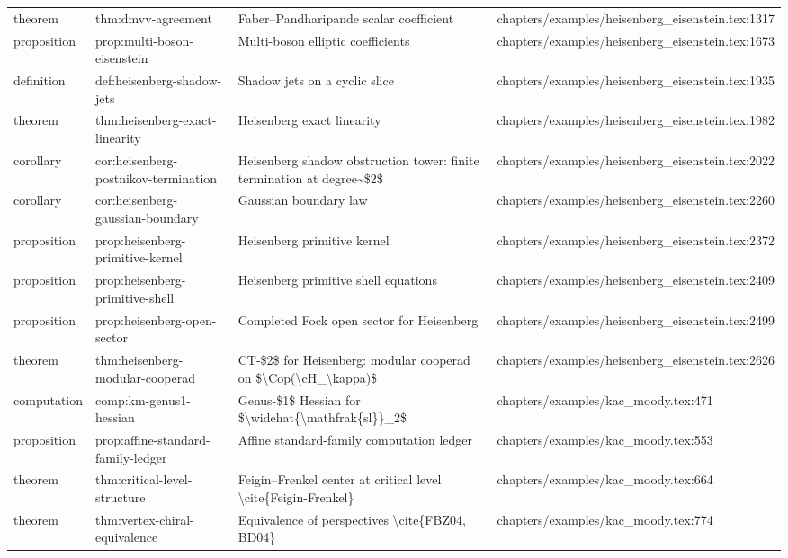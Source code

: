 \documentclass[11pt]{article}
\begin{document}
\begin{longtable}{L{0.10\textwidth}L{0.26\textwidth}L{0.42\textwidth}L{0.22\textwidth}}
theorem & thm:dmvv-agreement & Faber--Pandharipande scalar coefficient & chapters/examples/heisenberg\_eisenstein.tex:1317\\
proposition & prop:multi-boson-eisenstein & Multi-boson elliptic coefficients & chapters/examples/heisenberg\_eisenstein.tex:1673\\
definition & def:heisenberg-shadow-jets & Shadow jets on a cyclic slice & chapters/examples/heisenberg\_eisenstein.tex:1935\\
theorem & thm:heisenberg-exact-linearity & Heisenberg exact linearity & chapters/examples/heisenberg\_eisenstein.tex:1982\\
corollary & cor:heisenberg-postnikov-termination & Heisenberg shadow obstruction tower: finite termination at degree\textasciitilde{}\$2\$ & chapters/examples/heisenberg\_eisenstein.tex:2022\\
corollary & cor:heisenberg-gaussian-boundary & Gaussian boundary law & chapters/examples/heisenberg\_eisenstein.tex:2260\\
proposition & prop:heisenberg-primitive-kernel & Heisenberg primitive kernel & chapters/examples/heisenberg\_eisenstein.tex:2372\\
proposition & prop:heisenberg-primitive-shell & Heisenberg primitive shell equations & chapters/examples/heisenberg\_eisenstein.tex:2409\\
proposition & prop:heisenberg-op{}en-sector & Completed Fock op{}en sector for Heisenberg & chapters/examples/heisenberg\_eisenstein.tex:2499\\
theorem & thm:heisenberg-modular-cooperad & CT-\$2\$ for Heisenberg: modular cooperad on \$\textbackslash{}Cop(\textbackslash{}cH\_\textbackslash{}kappa)\$ & chapters/examples/heisenberg\_eisenstein.tex:2626\\
computation & comp:km-genus1-hessian & Genus-\$1\$ Hessian for \$\textbackslash{}widehat\{\textbackslash{}mathfrak\{sl\}\}\_2\$ & chapters/examples/kac\_moody.tex:471\\
proposition & prop:affine-standard-family-led{}ger & Affine standard-family computation led{}ger & chapters/examples/kac\_moody.tex:553\\
theorem & thm:critical-level-structure & Feigin--Frenkel center at critical level \textbackslash{}cite\{Feigin-Frenkel\} & chapters/examples/kac\_moody.tex:664\\
theorem & thm:vertex-chiral-equivalence & Equivalence of perspectives \textbackslash{}cite\{FBZ04, BD04\} & chapters/examples/kac\_moody.tex:774\\

\end{longtable}
\end{document}
